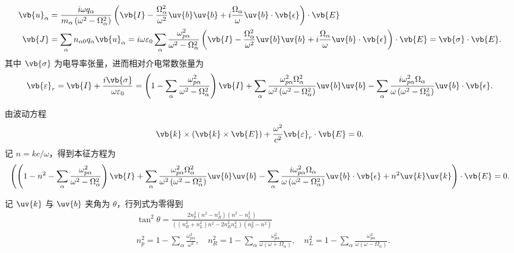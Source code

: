 \begin{align*}
	\vb{u}_\alpha &= \frac{i\omega q_\alpha}{m_\alpha \left( \omega^2 - \Omega_\alpha^2 \right)} \left( \vb{I} - \frac{\Omega_\alpha^2}{\omega^2}\uv{b}\uv{b} + i\frac{\Omega_\alpha}{\omega}\uv{b}\cdot\vb{\epsilon} \right)\cdot\vb{E}\\
	\vb{J} &= \sum_\alpha n_{\alpha 0} q_\alpha \vb{u}_\alpha = i\omega\varepsilon_0 \sum_\alpha \frac{\omega_{p\alpha}^2}{\omega^2 - \Omega_\alpha^2}\left( \vb{I} - \frac{\Omega_\alpha^2}{\omega^2}\uv{b}\uv{b} + i\frac{\Omega_\alpha}{\omega}\uv{b}\cdot\vb{\epsilon} \right)\cdot\vb{E}= \vb{\sigma}\cdot\vb{E}.
\end{align*}
其中 \(\vb{\sigma}\) 为电导率张量，进而相对介电常数张量为
\begin{align*}
	\vb{\varepsilon}_r = \vb{I} + \frac{i\vb{\sigma}}{\omega\varepsilon_0} = \left(1 - \sum_\alpha \frac{\omega_{p\alpha}^2}{\omega^2 - \Omega_\alpha^2}\right)\vb{I} + \sum_\alpha \frac{\omega_{p\alpha}^2 \Omega_\alpha^2}{\omega^2\left( \omega^2 - \Omega_\alpha^2 \right)}\uv{b}\uv{b} - \sum_\alpha \frac{i\omega_{p\alpha}^2 \Omega_\alpha}{\omega\left( \omega^2 - \Omega_\alpha^2 \right)}\uv{b}\cdot\vb{\epsilon}.
\end{align*}

由波动方程
\begin{align*}
	\vb{k}\times\left( \vb{k}\times\vb{E} \right) + \frac{\omega^2}{c^2}\vb{\varepsilon}_r\cdot\vb{E} = 0.
\end{align*}
记 \(n = kc/\omega\)，得到本征方程为
\begin{align*}
	\left( \left(1 - n^2 - \sum_\alpha \frac{\omega_{p\alpha}^2}{\omega^2 - \Omega_\alpha^2}\right)\vb{I} + \sum_\alpha \frac{\omega_{p\alpha}^2 \Omega_\alpha^2}{\omega^2\left( \omega^2 - \Omega_\alpha^2 \right)}\uv{b}\uv{b} - \sum_\alpha \frac{i\omega_{p\alpha}^2 \Omega_\alpha}{\omega\left( \omega^2 - \Omega_\alpha^2 \right)}\uv{b}\cdot\vb{\epsilon} + n^2\uv{k}\uv{k} \right)\cdot\vb{E} = 0.
\end{align*}

记 \(\uv{k}\) 与 \(\uv{b}\) 夹角为 \(\theta\)，行列式为零得到
\begin{align*}
	&\tan^2\theta = \frac{2n_p^2\left(n^2 - n_R^2\right)\left(n^2 - n_L^2\right)}{\left( \left(n_R^2 + n_L^2\right)n^2 - 2n_R^2 n_L^2 \right)\left(n_p^2 - n^2\right)}\\
	&n_p^2 = 1 - \sum_\alpha \frac{\omega_{p\alpha}^2}{\omega^2},\quad
	n_R^2 = 1 - \sum_\alpha \frac{\omega_{p\alpha}^2}{\omega\left( \omega + \Omega_\alpha \right)},\quad
	n_L^2 = 1 - \sum_\alpha \frac{\omega_{p\alpha}^2}{\omega\left( \omega - \Omega_\alpha \right)}.
\end{align*}

